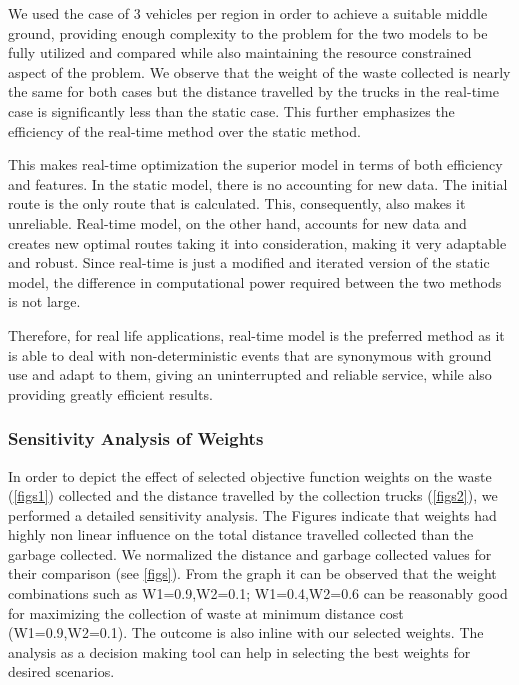 \documentclass[12pt]{article}
\begin{document}
We used the case of 3 vehicles per region in order to achieve a suitable middle ground, providing enough complexity to the problem for the two models to be fully utilized and compared while also maintaining the resource constrained aspect of the problem. We observe that the weight of the waste collected is nearly the same for both cases but the distance travelled by the trucks in the real-time case is significantly less than the static case. This further emphasizes the efficiency of the real-time method over the static method.

This makes real-time optimization the superior model in terms of both efficiency and features. In the static model, there is no accounting for new data. The initial route is the only route that is calculated. This, consequently, also makes it unreliable. Real-time model, on the other hand, accounts for new data and creates new optimal routes taking it into consideration, making it very adaptable and robust. Since real-time is just a modified and iterated version of the static model, the difference in computational power required between the two methods is not large. 

Therefore, for real life applications, real-time model is the preferred method as it is able to deal with non-deterministic events that are synonymous with ground use and adapt to them, giving an uninterrupted and reliable service, while also providing greatly efficient results.


 
\subsubsection*{Sensitivity Analysis of Weights}
In order to depict the effect of selected objective function weights on the waste  (\ref{figs1})  collected and the distance travelled by the collection trucks (\ref{figs2}), we performed a detailed sensitivity analysis. The Figures indicate that weights had highly non linear influence on the total distance travelled collected than the garbage collected. We normalized the distance and garbage collected values for their comparison (see \ref{figs}). From the graph it can be observed that the weight combinations such as W1=0.9,W2=0.1; W1=0.4,W2=0.6 can be reasonably good for maximizing the collection of waste at minimum distance cost (W1=0.9,W2=0.1). The outcome is also inline with our selected weights. The analysis as a decision making tool can help  in selecting the best weights for desired scenarios.
\end{document}
